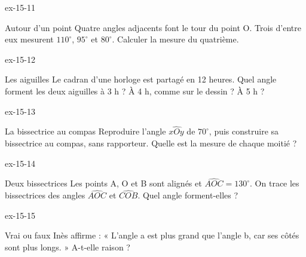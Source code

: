 \begin{blocLivre}{ex-15-11}\begin{exercice}[3]{Autour d’un point}
Quatre angles adjacents font le tour du point O. Trois d’entre eux mesurent $110^\circ$, $95^\circ$ et $80^\circ$. Calculer la mesure du quatrième.
\label{fig-ex-15-11}
\end{exercice}\end{blocLivre}
\begin{blocLivre}{ex-15-12}\begin{exercice}[3]{Les aiguilles}
Le cadran d’une horloge est partagé en 12 heures. Quel angle forment les deux aiguilles à 3 h ? À 4 h, comme sur le dessin ? À 5 h ?
\label{fig-ex-15-12}
\end{exercice}\end{blocLivre}
\begin{blocLivre}{ex-15-13}\begin{exercice}[3]{La bissectrice au compas}
Reproduire l’angle $\widehat{xOy}$ de $70^\circ$, puis construire sa bissectrice au compas, sans rapporteur. Quelle est la mesure de chaque moitié ?
\label{fig-ex-15-13}
\end{exercice}\end{blocLivre}
\begin{blocLivre}{ex-15-14}\begin{exercice}[3]{Deux bissectrices}
Les points A, O et B sont alignés et $\widehat{AOC}=130^\circ$. On trace les bissectrices des angles $\widehat{AOC}$ et $\widehat{COB}$. Quel angle forment-elles ?
\label{fig-ex-15-14}
\end{exercice}\end{blocLivre}
\begin{blocLivre}{ex-15-15}\begin{exercice}[3]{Vrai ou faux}
Inès affirme : « L’angle a est plus grand que l’angle b, car ses côtés sont plus longs. » A-t-elle raison ?
\label{fig-ex-15-15}
\end{exercice}\end{blocLivre}

\clearpage
